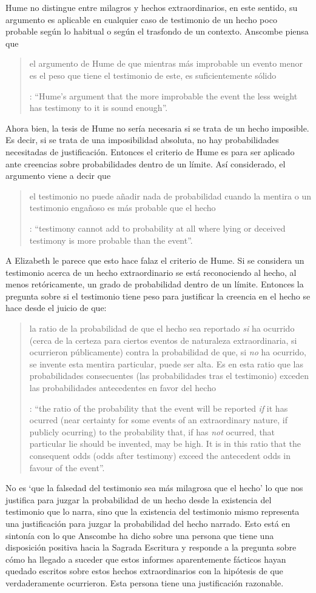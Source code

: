 Hume no distingue entre milagros y hechos extraordinarios, en este sentido, su argumento es aplicable en cualquier caso de testimonio de un hecho poco probable según lo habitual o según el trasfondo de un contexto. Anscombe piensa que \blockquote[{\Cite[47]{anscombe2008faith:hummi}}: \enquote{Hume's argument that the more improbable the event the less weight has testimony to it is sound enough}.]{el argumento de Hume de que mientras más improbable un evento menor es el peso que tiene el testimonio de este, es suficientemente sólido}. Ahora bien, la tesis de Hume no sería necesaria si se trata de un hecho imposible. Es decir, si se trata de una imposibilidad absoluta, no hay probabilidades necesitadas de justificación. Entonces el criterio de Hume es para ser aplicado ante creencias sobre probabilidades dentro de un límite. Así considerado, el argumento viene a decir que \blockquote[{\Cite[47]{anscombe2008faith:hummi}}: \enquote{testimony cannot add to probability at all where lying or deceived testimony is more probable than the event}.]{el testimonio no puede añadir nada de probabilidad cuando la mentira o un testimonio engañoso es más probable que el hecho}. A Elizabeth le parece que esto hace falaz el criterio de Hume. Si se considera un testimonio acerca de un hecho extraordinario se está reconociendo al hecho, al menos retóricamente, un grado de probabilidad dentro de un límite. Entonces la pregunta sobre si el testimonio tiene peso para justificar la creencia en el hecho se hace desde el juicio de que: \blockquote[{\Cite[47]{anscombe2008faith:hummi}}: \enquote{the ratio of the probability that the event will be reported \emph{if} it has ocurred (near certainty for some events of an extraordinary nature, if publicly ocurring) to the probability that, if has \emph{not} ocurred, that particular lie should be invented, may be high. It is in this ratio that the consequent odds (odds after testimony) exceed the antecedent odds in favour of the event}.]{la ratio de la probabilidad de que el hecho sea reportado \emph{si} ha ocurrido (cerca de la certeza para ciertos eventos de naturaleza extraordinaria, si ocurrieron públicamente) contra la probabilidad de que, si \emph{no} ha ocurrido, se invente esta mentira particular, puede ser alta. Es en esta ratio que las probabilidades consecuentes (las probabilidades tras el testimonio) exceden las probabilidades antecedentes en favor del hecho}. No es \enquote*{que la falsedad del testimonio sea más milagrosa que el hecho} lo que nos justifica para juzgar la probabilidad de un hecho desde la existencia del testimonio que lo narra, sino que la existencia del testimonio mismo representa una justificación para juzgar la probabilidad del hecho narrado. Esto está en sintonía con lo que Anscombe ha dicho sobre una persona que tiene una disposición positiva hacia la Sagrada Escritura y responde a la pregunta sobre cómo ha llegado a suceder que estos informes aparentemente fácticos hayan quedado escritos sobre estos hechos extraordinarios con la hipótesis de que verdaderamente ocurrieron. Esta persona tiene una justificación razonable.
